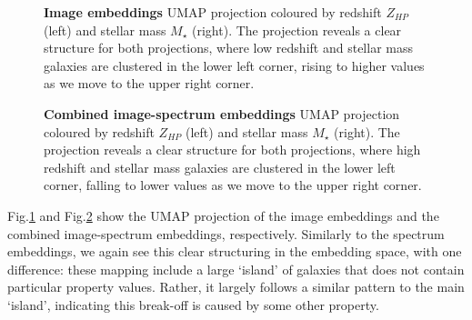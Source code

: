 \documentclass[draft, a4paper,12pt]{article}
\begin{document}
\begin{figure}[H]
    \centering
    \caption{\textbf{Image embeddings} UMAP projection coloured by redshift $Z_{HP}$ (left) and stellar mass $M_{\star}$ (right). The projection reveals a clear structure for both projections, where low redshift and stellar mass galaxies are clustered in the lower left corner, rising to higher values as we move to the upper right corner.}
    \label{fig:umap_of_images}
\end{figure}


\begin{figure}[H]
    \centering
    \caption{ \textbf{Combined image-spectrum embeddings} UMAP projection coloured by redshift $Z_{HP}$ (left) and stellar mass $M_{\star}$ (right). The projection reveals a clear structure for both projections, where high redshift and stellar mass galaxies are clustered in the lower left corner, falling to lower values as we move to the upper right corner.}
    \label{fig:umap_of_both}
\end{figure}

Fig.\ref{fig:umap_of_images} and Fig.\ref{fig:umap_of_both} show the UMAP projection of the image embeddings and the combined image-spectrum embeddings, respectively. Similarly to the spectrum embeddings, we again see this clear structuring in the embedding space, with one difference: these mapping include a large `island' of galaxies that does not contain particular property values. Rather, it largely follows a similar pattern to the main `island', indicating this break-off is caused by some other property.



\end{document}
